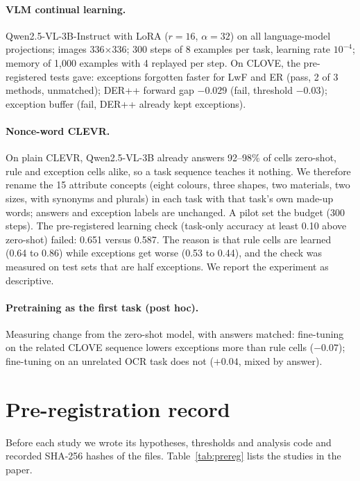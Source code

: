 \paragraph{VLM continual learning.}
Qwen2.5-VL-3B-Instruct with LoRA ($r=16$, $\alpha=32$) on all language-model projections;
images 336$\times$336; 300 steps of 8 examples per task, learning rate $10^{-4}$; memory of
1{,}000 examples with 4 replayed per step. On CLOVE, the pre-registered tests gave: exceptions
forgotten faster for LwF and ER (pass, 2 of 3 methods, unmatched); DER++ forward gap $-0.029$
(fail, threshold $-0.03$); exception buffer (fail, DER++ already kept exceptions).

\paragraph{Nonce-word CLEVR.}
On plain CLEVR, Qwen2.5-VL-3B already answers 92--98\% of cells zero-shot, rule and exception
cells alike, so a task sequence teaches it nothing. We therefore rename the 15 attribute
concepts (eight colours, three shapes, two materials, two sizes, with synonyms and plurals) in
each task with that task's own made-up words; answers and exception labels are unchanged. A
pilot set the budget (300 steps). The pre-registered learning check (task-only accuracy at
least 0.10 above zero-shot) failed: 0.651 versus 0.587. The reason is that rule cells are
learned (0.64 to 0.86) while exceptions get worse (0.53 to 0.44), and the check was measured on
test sets that are half exceptions. We report the experiment as descriptive.

\paragraph{Pretraining as the first task (post hoc).}
Measuring change from the zero-shot model, with answers matched: fine-tuning on the related
CLOVE sequence lowers exceptions more than rule cells ($-0.07$); fine-tuning on an unrelated
OCR task does not ($+0.04$, mixed by answer).

\section{Pre-registration record}
\label{sup:prereg}

Before each study we wrote its hypotheses, thresholds and analysis code and recorded SHA-256
hashes of the files. Table~\ref{tab:prereg} lists the studies in the paper.

